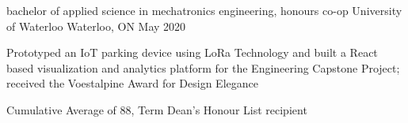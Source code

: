 
\begin{cventries}
  \cventry
    {bachelor of applied science in mechatronics engineering, honours co-op} %
    {University of Waterloo} %
    {Waterloo, ON} %
    {May 2020} %
    {
      \begin{cvitems} %
          \vspace{1.0mm}
          \item {Prototyped an IoT parking device using LoRa Technology and built a React based visualization and analytics platform for the Engineering Capstone Project; received the Voestalpine Award for Design Elegance}
          \vspace{1.0mm}
          \item {Cumulative Average of 88, Term Dean's Honour List recipient}
      \end{cvitems}
    }
\end{cventries}
